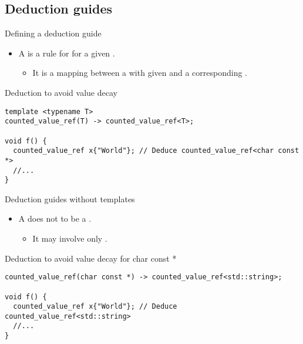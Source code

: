 \subsection{Deduction guides}

\begin{frame}[t,fragile]{Defining a deduction guide}
\begin{itemize}
  \item A  is a rule for  
        for a given .
    \begin{itemize}
      \item It is a mapping between a  with given 
             and a corresponding .
    \end{itemize}
\end{itemize}

\begin{block}{Deduction to avoid value decay}
\begin{lstlisting}
template <typename T>
counted_value_ref(T) -> counted_value_ref<T>;

void f() {
  counted_value_ref x{"World"}; // Deduce counted_value_ref<char const *>
  //...
}
\end{lstlisting}
\end{block}
\end{frame}

\begin{frame}[t,fragile]{Deduction guides without templates}
\begin{itemize}
  \item A  does not to be a .
    \begin{itemize}
      \item It may involve only .
    \end{itemize}
\end{itemize}

\begin{block}{Deduction to avoid value decay for char const *}
\begin{lstlisting}
counted_value_ref(char const *) -> counted_value_ref<std::string>;

void f() {
  counted_value_ref x{"World"}; // Deduce counted_value_ref<std::string>
  //...
}
\end{lstlisting}
\end{block}
\end{frame}

